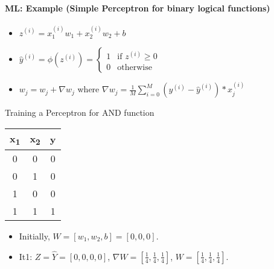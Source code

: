\documentclass[xcolor=table]{beamer}
\subtitle[ML for NLP]{Chapter 02\\Machine learning for NLP}
\begin{document}
	

\begin{frame}
	\frametitle{\inserttitle}
	\framesubtitle{ML: Example (Simple Perceptron for binary logical functions)}
	
	\begin{minipage}{0.30\textwidth} 
	\end{minipage}
	\begin{minipage}{0.59\textwidth}
		\scriptsize
		\begin{itemize}
			\item $ z^{(i)} = x_1^{(i)} w_1 + x_2^{(i)} w_2 + b $
			\item $ \hat{y}^{(i)} = \phi(z^{(i)}) = \begin{cases}
				1 & \text{if } z^{(i)} \ge 0 \\
				0 & \text{otherwise}
			\end{cases} $
			\item $ w_j = w_j + \nabla w_j$ where $ \nabla w_j = \frac{1}{M}\sum_{i=0}^{M} (y^{(i)} - \hat{y}^{(i)}) * x_j^{(i)} $
		\end{itemize}
	\end{minipage}
	
	\vfill
	
	\begin{exampleblock}{Training a Perceptron for AND function}
		\begin{minipage}{0.2\textwidth} 
			\scriptsize
			\begin{tabular}{|c|c|c|}
				\hline
				x\textsubscript{1} & x\textsubscript{2} & y \\
				\hline
				0 & 0 & 0  \\
				\hline
				0 & 1 & 0 \\
				\hline
				1 & 0 & 0 \\
				\hline
				1 & 1 & 1 \\
				\hline
			\end{tabular}
		\end{minipage}
		\begin{minipage}{0.79\textwidth}
			\scriptsize
			\begin{itemize}
				\item Initially, $ W = [w_1, w_2, b] = [0, 0, 0] $.
				
				\item It1: $ Z = \hat{Y} = [0, 0, 0, 0] $, 
				$ \nabla W = [\frac{1}{4}, \frac{1}{4}, \frac{1}{4}] $, 
				$ W = [\frac{1}{4}, \frac{1}{4}, \frac{1}{4}] $.
				

\end{itemize}
\end{minipage}
\end{exampleblock}
\end{frame}
\end{document}
